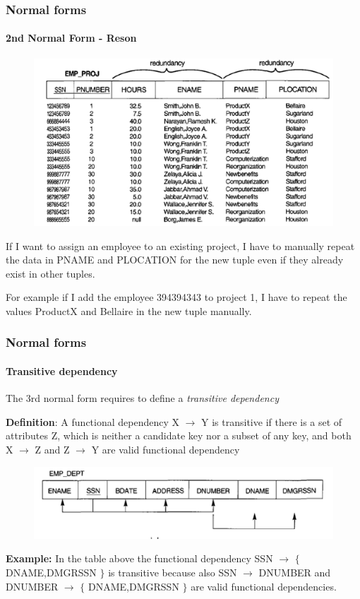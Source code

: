 \documentclass{beamer}
\newcommand{\valseq}[1]{$\lbrace$ #1 $\rbrace$}
\newcommand{\fdep}[2]{#1 $\rightarrow$ #2}
\begin{document}
\begin{frame}
	\frametitle{Normal forms}
	\framesubtitle{2nd Normal Form - Reson}
	
	\begin{figure}
		\includegraphics[scale=0.4]{img/normalization/norm10}
	\end{figure}
	
	If I want to assign an employee to an existing project, I have to manually repeat the data in PNAME and PLOCATION for the new tuple even if they already exist in other tuples.
	
	
	For example if I add the employee 394394343 to project 1, I have to repeat the values ProductX and Bellaire in the new tuple manually.
\end{frame}

\begin{frame}
	\frametitle{Normal forms}
	\framesubtitle{Transitive dependency}
	
	The 3rd normal form requires to define a \textit{transitive dependency}
	
	\textbf{Definition}:
	A functional dependency \fdep{X}{Y} is transitive if there is a set of attributes Z, which is neither a candidate key nor a subset of any key, and both \fdep{X}{Z} and \fdep{Z}{Y} are valid functional dependency
	
	\begin{figure}
		\includegraphics[scale=0.4]{img/normalization/norm9}
	\end{figure}
	
	\textbf{Example:}
	In the table above the functional dependency \fdep{SSN}{\valseq{DNAME,DMGRSSN}} is transitive because also \fdep{SSN}{DNUMBER} and \fdep{DNUMBER}{\valseq{DNAME,DMGRSSN}} are valid functional dependencies.	
\end{frame}
\end{document}
